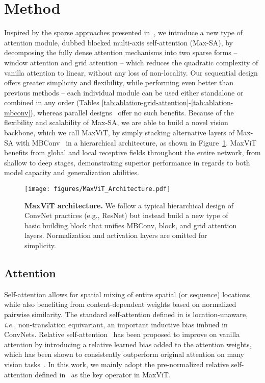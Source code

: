 \documentclass[runningheads]{llncs}
\def\ie{\emph{i.e.}, }
\begin{document}
\section{Method}

Inspired by the sparse approaches presented in~\cite{zhao2021improved,tu2022maxim}, we introduce a new type of attention module, dubbed blocked multi-axis self-attention (Max-SA), by decomposing the fully dense attention mechanisms into two sparse forms -- window attention and grid attention -- which reduces the quadratic complexity of vanilla attention to linear, without any loss of non-locality.
Our sequential design offers greater simplicity and flexibility, while performing even better than previous methods -- each individual module can be used either standalone or combined in any order (Tables \ref{tab:ablation-grid-attention}-\ref{tab:ablation-mbconv}), whereas parallel designs~\cite{zhao2021improved,tu2022maxim} offer no such benefits.
Because of the flexibility and scalability of Max-SA, we are able to build a novel vision backbone, which we call MaxViT, by simply stacking alternative layers of Max-SA with MBConv~\cite{howard2017mobilenets} in a hierarchical architecture, as shown in Figure~\ref{fig:maxt-architecture}.
MaxViT benefits from global and local receptive fields throughout the entire network, from shallow to deep stages, demonstrating superior performance in regards to both model capacity and generalization abilities.


\begin{figure}[!t]
\centering
\texttt{[image: figures/MaxViT\_Architecture.pdf]}
\caption{\textbf{MaxViT architecture.} We follow a typical hierarchical design of ConvNet practices (e.g., ResNet) but instead build a new type of basic building block that unifies MBConv, block, and grid attention layers. Normalization and activation layers are omitted for simplicity.}
\label{fig:maxt-architecture}
\end{figure}

\subsection{Attention}
Self-attention allows for spatial mixing of entire spatial (or sequence) locations while also benefiting from content-dependent weights based on normalized pairwise similarity. 
The standard self-attention defined in \cite{vaswani2017attention,dosovitskiy2020image} is location-unaware, \ie non-translation equivariant, an important inductive bias imbued in ConvNets.
Relative self-attention~\cite{liu2021swin,dai2021coatnet,shaw2018self,jiang2021transgan} has been proposed to improve on vanilla attention by introducing a relative learned bias added to the attention weights, which has been shown to consistently outperform original attention on many vision tasks~\cite{liu2021swin,dai2021coatnet,jiang2021transgan}.
In this work, we 
mainly adopt the pre-normalized relative self-attention defined in~\cite{dai2021coatnet} as the key operator in MaxViT.
\end{document}
